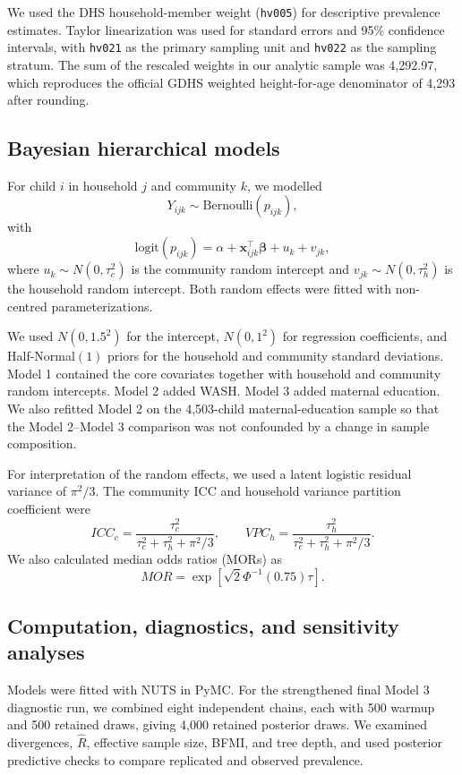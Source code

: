 \documentclass[11pt]{article}
\begin{document}
We used the DHS household-member weight (\texttt{hv005}) for descriptive prevalence estimates. Taylor linearization was used for standard errors and 95\% confidence intervals, with \texttt{hv021} as the primary sampling unit and \texttt{hv022} as the sampling stratum. The sum of the rescaled weights in our analytic sample was 4,292.97, which reproduces the official GDHS weighted height-for-age denominator of 4,293 after rounding.

\subsection{Bayesian hierarchical models}

For child $i$ in household $j$ and community $k$, we modelled
\[
Y_{ijk}\sim\text{Bernoulli}(p_{ijk}),
\]
with
\[
\text{logit}(p_{ijk})
=
\alpha+\mathbf{x}_{ijk}^{\top}\boldsymbol{\beta}+u_k+v_{jk},
\]
where $u_k\sim N(0,\tau_c^2)$ is the community random intercept and $v_{jk}\sim N(0,\tau_h^2)$ is the household random intercept. Both random effects were fitted with non-centred parameterizations.

We used $N(0,1.5^2)$ for the intercept, $N(0,1^2)$ for regression coefficients, and Half-Normal$(1)$ priors for the household and community standard deviations. Model 1 contained the core covariates together with household and community random intercepts. Model 2 added WASH. Model 3 added maternal education. We also refitted Model 2 on the 4,503-child maternal-education sample so that the Model 2--Model 3 comparison was not confounded by a change in sample composition.

For interpretation of the random effects, we used a latent logistic residual variance of $\pi^2/3$. The community ICC and household variance partition coefficient were
\[
ICC_c=
\frac{\tau_c^2}{\tau_c^2+\tau_h^2+\pi^2/3},
\qquad
VPC_h=
\frac{\tau_h^2}{\tau_c^2+\tau_h^2+\pi^2/3}.
\]
We also calculated median odds ratios (MORs) as
\[
MOR=\exp\left[\sqrt{2}\Phi^{-1}(0.75)\tau\right].
\]

\subsection{Computation, diagnostics, and sensitivity analyses}

Models were fitted with NUTS in PyMC. For the strengthened final Model 3 diagnostic run, we combined eight independent chains, each with 500 warmup and 500 retained draws, giving 4,000 retained posterior draws. We examined divergences, $\hat R$, effective sample size, BFMI, and tree depth, and used posterior predictive checks to compare replicated and observed prevalence.
\end{document}
